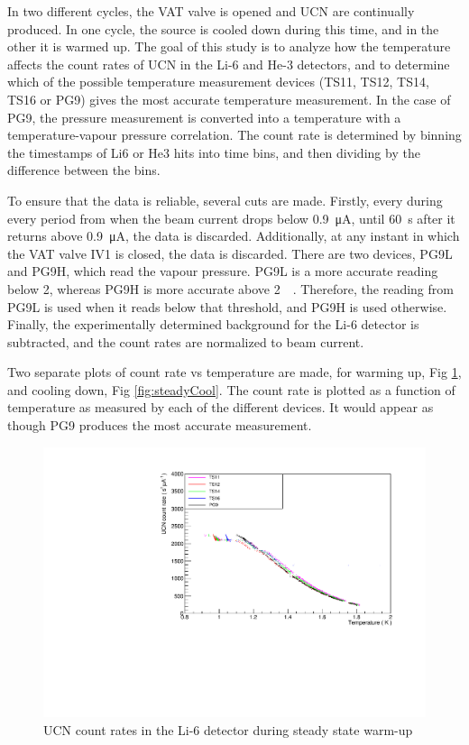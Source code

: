 \documentclass[10pt,letterpaper]{article}
\begin{document}
In two different cycles, the VAT valve is opened and UCN are continually produced. In one cycle, the source is cooled down during this time, and in the other it is warmed up. The goal of this study is to analyze how the temperature affects the count rates of UCN in the Li-6 and He-3 detectors, and to determine which of the possible temperature measurement devices (TS11, TS12, TS14, TS16 or PG9) gives the most accurate temperature measurement. In the case of PG9, the pressure measurement is converted into a temperature with a temperature-vapour pressure correlation. The count rate is determined by binning the timestamps of Li6 or He3 hits into time bins, and then dividing by the difference between the bins.

To ensure that the data is reliable, several cuts are made. Firstly, every during every period from when the beam current drops below \SI{0.9}{\micro\ampere}, until \SI{60}{\second} after it returns above \SI{0.9}{\micro\ampere}, the data is discarded. Additionally, at any instant in which the VAT valve IV1 is closed, the data is discarded. There are two devices, PG9L and PG9H, which read the vapour pressure. PG9L is a more accurate reading below \SI{2}{\torr}, whereas PG9H is more accurate above \SI{2}{\milli\torr}. Therefore, the reading from PG9L is used when it reads below that threshold, and PG9H is used otherwise. Finally, the experimentally determined background for the Li-6 detector is subtracted, and the count rates are normalized to beam current.

Two separate plots of count rate vs temperature are made, for warming up, Fig \ref{fig:steadyWarm}, and cooling down, Fig \ref{fig:steadyCool}. The count rate is plotted as a function of temperature as measured by each of the different devices. It would appear as though PG9 produces the most accurate measurement.

\begin{figure}
\centering
\includegraphics[width=\textwidth,page=1]{../steady_state/li6RateVsTempRun1162.pdf}
\caption{UCN count rates in the Li-6 detector during steady state warm-up}
\label{fig:steadyWarm}
\end{figure}
\end{document}
